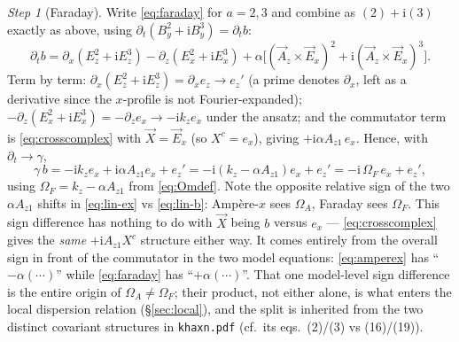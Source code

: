 \documentclass[11pt,a4paper]{article}
\numberwithin{equation}{section}
\theoremstyle{remark}
\newtheorem{step}{Step}[subsection]
\newcommand{\kz}{k_z}
\newcommand{\OmA}{\Omega_A}
\newcommand{\OmF}{\Omega_F}
\newcommand{\Az}{A_{z1}}
\newcommand{\ii}{\mathrm{i}}
\begin{document}
\begin{step}[Faraday]
Write \eqref{eq:faraday} for $a=2,3$ and combine as $(2)+\ii(3)$ exactly as
above, using $\partial_t(B_y^2+\ii B_y^3)=\partial_tb$:
\begin{equation}
\partial_tb=\partial_x(E_z^2+\ii E_z^3)-\partial_z(E_x^2+\ii E_x^3)
+\alpha\bigl[(\vec A_z\times\vec E_x)^2+\ii(\vec A_z\times\vec E_x)^3\bigr].
\end{equation}
Term by term: $\partial_x(E_z^2+\ii E_z^3)=\partial_xe_z\to e_z'$ (a prime
denotes $\partial_x$, left as a derivative since the $x$-profile is not
Fourier-expanded); $-\partial_z(E_x^2+\ii E_x^3)=-\partial_ze_x\to
-\ii\kz e_x$ under the ansatz; and the commutator term is
\eqref{eq:crosscomplex} with $\vec X=\vec E_x$ (so $X^c=e_x$), giving
$+\ii\alpha\Az\,e_x$. Hence, with $\partial_t\to\gamma$,
\begin{equation}
\gamma\,b=-\ii\kz e_x+\ii\alpha\Az e_x+e_z'
=-\ii(\kz-\alpha\Az)e_x+e_z'
=-\ii\,\OmF\,e_x+e_z' ,
\label{eq:lin-b}
\end{equation}
using $\OmF=\kz-\alpha\Az$ from \eqref{eq:Omdef}. Note the opposite
relative sign of the two $\alpha\Az$ shifts in \eqref{eq:lin-ex} vs
\eqref{eq:lin-b}: Amp\`ere-$x$ sees $\OmA$, Faraday sees $\OmF$. This
sign difference has nothing to do with $\vec X$ being $b$ versus $e_x$ ---
\eqref{eq:crosscomplex} gives the \emph{same} $+\ii\Az X^c$ structure
either way. It comes entirely from the overall sign in front of the
commutator in the two model equations: \eqref{eq:amperex} has
``$-\alpha(\cdots)$'' while \eqref{eq:faraday} has ``$+\alpha(\cdots)$''.
That one model-level sign difference is the entire origin of $\OmA\neq
\OmF$; their product, not either alone, is what enters the local
dispersion relation (\S\ref{sec:local}), and the split is inherited from
the two distinct covariant structures in \texttt{khaxn.pdf} (cf.\ its
eqs.\ (2)/(3) vs (16)/(19)).
\end{step}
\end{document}
